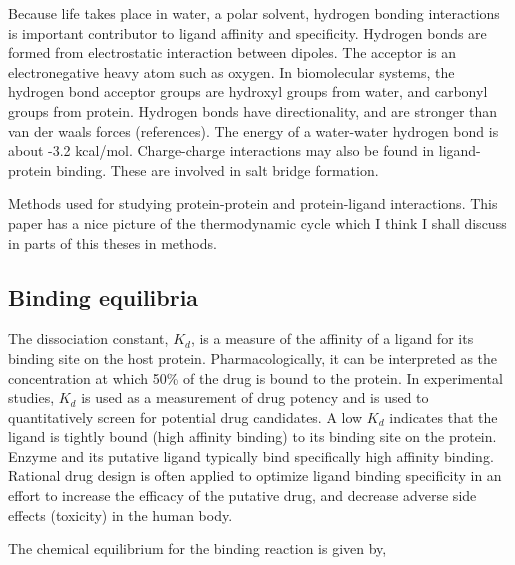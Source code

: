 Because life takes place in water, a polar solvent, hydrogen bonding interactions is important contributor to ligand affinity and specificity.  Hydrogen bonds are formed from electrostatic interaction between dipoles.  The acceptor is an electronegative heavy atom such as oxygen. In biomolecular systems, the hydrogen bond acceptor groups are hydroxyl groups from water, and carbonyl groups from protein. Hydrogen bonds have directionality, and are stronger than van der waals forces (references).  The energy of a water-water hydrogen bond is about -3.2 kcal/mol. Charge-charge interactions may also be found in ligand-protein binding.  These are involved in salt bridge formation.


Methods used for studying protein-protein and protein-ligand interactions.\cite{Wang:2001ez}
This paper\cite{Durrant:2011bm} has a nice picture of the thermodynamic cycle which I think I shall discuss in parts of this theses in methods.

\subsection{Binding equilibria}


The dissociation constant, $K_d$, is a measure of the affinity of a ligand for its binding site on the host protein. Pharmacologically, it can be interpreted as the concentration at which 50\% of the drug is bound to the protein. In experimental studies, $K_d$ is used as a measurement of drug potency and is used to quantitatively screen for potential drug candidates.  A low $K_d$ indicates that the ligand is tightly bound (high affinity binding) to its binding site on the protein.  Enzyme and its putative ligand typically bind specifically high affinity binding.  Rational drug design is often applied to optimize ligand binding specificity in an effort to increase the efficacy of the putative drug, and decrease adverse side effects (toxicity) in the human body.

The chemical equilibrium for the binding reaction is given by,

